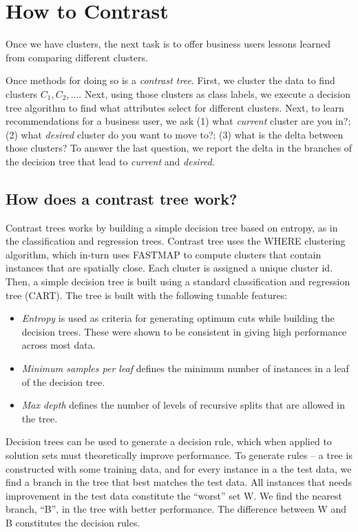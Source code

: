 \documentclass[conference]{IEEEtran}
\begin{document}
	\section{How to Contrast}
	Once we have  clusters, the next task is to offer business users lessons learned from comparing different clusters.
	
	Once methods for doing so is a {\em contrast tree}.
	First, we cluster the data to find clusters $C_1,C_2,...$.
	Next, using those clusters as class labels, we execute a decision tree algorithm to find what attributes select for different clusters. Next, to learn recommendations for a business user, we ask (1) what {\em current} cluster are you in?; (2) what {\em desired} cluster do you want to move to?; (3) what is the delta between those clusters? To answer the last question, we report the delta in the branches of the decision tree that lead to {\em current} and {\em desired}. 
	
	\subsection{How does a contrast tree work?}
	Contrast trees works by building a simple decision tree based on entropy, as in the classification and regression trees. Contrast tree uses the WHERE clustering algorithm, which in-turn uses FASTMAP \cite{} to compute clusters 
	that contain instances that are spatially close. Each cluster is assigned a unique cluster id. Then, a simple decision tree is built using a standard classification and regression tree (CART). The tree is built with the following tunable features:
	\begin{itemize}
		\item \textit{Entropy} is used as criteria for generating optimum cuts while building the decision trees. These were shown to be consistent in giving high performance across most data.
		\item \textit{Minimum samples per leaf} defines the minimum number of instances in a leaf of the decision tree.
		\item \textit{Max depth} defines the number of levels of recursive splits that are allowed in the tree.
	\end{itemize}
	Decision trees can be used to generate a decision rule, which when applied to solution sets must theoretically improve performance. To generate rules -- a tree is constructed with some training data, and for every instance in a the test data, we find a branch in the tree that best matches the test data. All instances that needs improvement in the test data constitute the ``worst'' set W. We find the nearest branch, ``B'', in the tree with better performance. The difference between W and B constitutes the decision rules.
	
\end{document}
